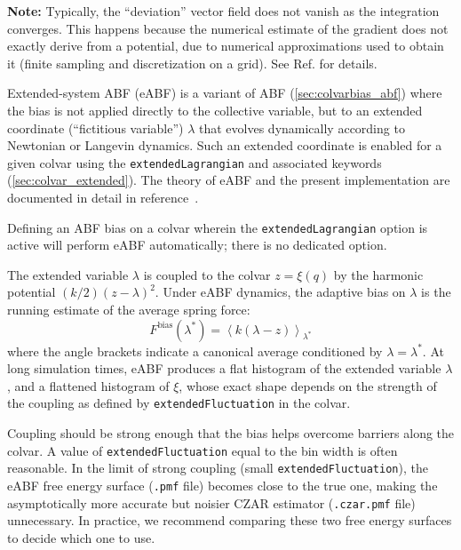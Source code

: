 \textbf{Note:} Typically, the ``deviation'' vector field does not
vanish as the integration converges. This happens because the
numerical estimate of the gradient does not exactly derive from a
potential, due to numerical approximations used to obtain it (finite
sampling and discretization on a grid). See Ref.\cite{Henin2021} for details.




Extended-system ABF (eABF) is a variant of ABF (\ref{sec:colvarbias_abf})
where the bias is not applied
directly to the collective variable, but to an extended coordinate  (``fictitious variable'')
$\lambda$ that evolves dynamically according to Newtonian or Langevin dynamics.
Such an extended coordinate is enabled for a given colvar using the
\texttt{extendedLagrangian} and associated keywords (\ref{sec:colvar_extended}).
The theory of eABF and the present implementation are documented in detail
in reference~\cite{Lesage2017}.

Defining an ABF bias on a colvar wherein the \texttt{extendedLagrangian} option
is active will perform eABF automatically; there is no dedicated option.

The extended variable $\lambda$ is coupled to the colvar $z=\xi(q)$ by the harmonic potential
$(k/2) (z - \lambda)^2$.
Under eABF dynamics, the adaptive bias on $\lambda$ is
the running estimate of the average spring force:
\begin{equation}
F^{\mathrm{bias}}(\lambda^{*}) = \left\langle k(\lambda{} - z) \right\rangle_{\lambda^{*}}
\end{equation}
where the angle brackets indicate a canonical average conditioned by $\lambda=\lambda^*$.
At long simulation times, eABF produces a flat histogram of the extended variable $\lambda$,
and a flattened histogram of $\xi$, whose exact shape depends on the strength of the coupling
as defined by \texttt{extendedFluctuation} in the colvar.

Coupling should be strong enough that the bias helps overcome barriers along the colvar.\cite{Lesage2017}
A value of \texttt{extendedFluctuation} equal to the bin width is often reasonable.
In the limit of strong coupling (small \texttt{extendedFluctuation}), the eABF free energy surface
(\texttt{.pmf} file) becomes close to the true one, making the asymptotically more accurate but
noisier CZAR estimator (\texttt{.czar.pmf} file) unnecessary.
In practice, we recommend comparing these two free energy surfaces to decide which one to use.

